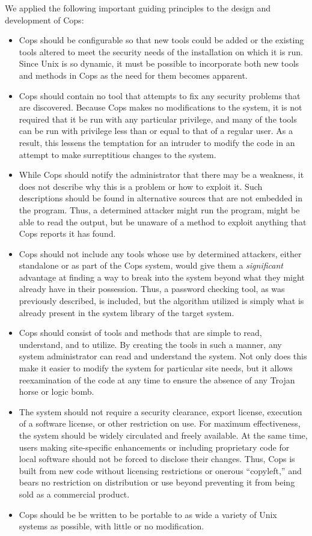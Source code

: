 We applied the following important guiding principles to the
design and development of {\sc Cops}:
\begin{itemize}
\item
{\sc Cops} should be configurable so that new tools could be added or
the existing tools altered to meet the security needs of the
installation on which it is run.  Since {\sc Unix} is so dynamic, it
must be possible to incorporate both new tools and methods in {\sc Cops} as the need
for them becomes apparent.
\item
{\sc Cops} should contain no 
tool that attempts to fix any security problems that are discovered.
Because {\sc Cops} makes no modifications to the system, it is not required that 
it be run with any particular privilege, and many of the tools 
can be run with privilege less than or equal to that of a regular user.
As a result, this lessens the temptation for an intruder to modify
the code in an attempt to make surreptitious changes to the system.
\item
While {\sc Cops}  should notify the administrator that there may be a 
weakness, it does not describe why this is a problem or how to exploit
it.  Such descriptions should be found in alternative sources that are not 
embedded in the program.  Thus, a determined attacker might run 
the program, might be able to read the output, but be unaware of a 
method to exploit anything that {\sc Cops} reports it has found.  
\item
{\sc Cops} should not include any tools whose use by determined 
attackers, either standalone or as part of the {\sc Cops} system, would give them
a {\em significant} advantage at finding a way to break into the system 
beyond what they might already have in their possession.  Thus, a 
password checking tool, as was previously described, is
included, but the algorithm utilized is simply what is already present in 
the system library of the target system.
\item
{\sc Cops} should consist of tools and methods that are simple to read,
understand, and to utilize.  By creating the tools in such a manner, any
system administrator can read and understand the system.  Not only does this
make it easier to modify the system for particular site
needs, but it allows  reexamination of the code at any time to ensure
the absence of any Trojan horse or logic bomb.
\item
The system should not require a security clearance, export license,
execution of a software
license, or other restriction on use.  For maximum effectiveness, the
system should be widely circulated and freely available.  At the same
time, users making site-specific enhancements or including proprietary
code for local software should not be forced to disclose their
changes.
Thus, {\sc Cops} is built from new code without licensing restrictions or
onerous ``copyleft,'' and bears no restriction on distribution or use
beyond preventing it from being sold as a commercial product.
\item
{\sc Cops} should be be written to be portable to as wide a variety of
{\sc Unix} systems as possible, with little or no modification.
\end{itemize}

